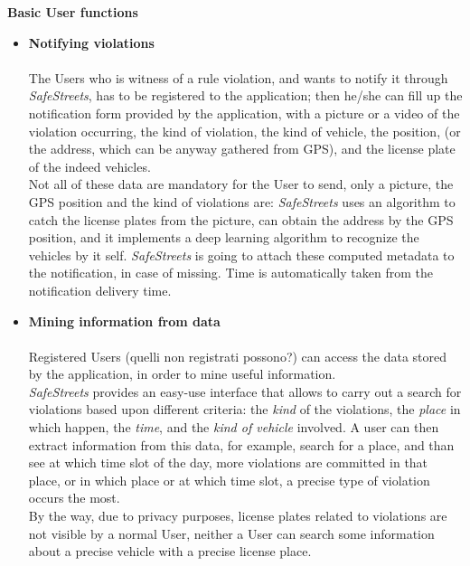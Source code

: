 \textbf{Basic User functions} \\
\begin{itemize}
    \item \textbf{Notifying violations}\\\\
    The Users who is witness of a rule violation, and wants to notify it through \textit{SafeStreets}, has to be registered to the application; then he/she can fill up the notification form provided by the application, with a picture or a video of the violation occurring, the kind of violation, the kind of vehicle, the position, (or the address, which can be anyway gathered from GPS), and the license plate of the indeed vehicles.\\
    Not all of these data are mandatory for the User to send, only a picture, the GPS position and the kind of violations are: \textit{SafeStreets} uses an algorithm to catch the license plates from the picture, can obtain the address by the GPS position, and it implements a deep learning algorithm to recognize the vehicles by it self. \textit{SafeStreets} is going to attach these computed metadata to the notification, in case of missing. Time is automatically taken from the notification delivery time.
    
    \item\textbf{Mining information from data}\\\\
    Registered Users (quelli non registrati possono?) can access the  data stored by the application, in order to mine useful information. \\ \textit{SafeStreets} provides an easy-use interface that allows to  carry out a search for violations based upon different criteria: the \textit{kind} of the violations, the \textit{place} in which happen, the \textit{time}, and the \textit{kind of vehicle} involved. 
    A user can then extract information from this data, for example, search for a place, and than see at which time slot of the day, more violations are committed in that place, or in which place or at which time slot, a precise type of violation occurs the most.\\
    By the way, due to privacy purposes, license plates related to violations are not visible by a normal User, neither a User can search some information about a precise vehicle with a precise license place.
    
    \end{itemize}  
    
